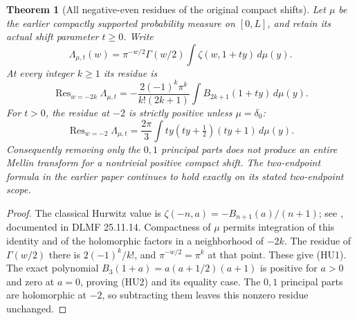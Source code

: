 \documentclass[11pt]{article}
\newtheorem{theorem}{Theorem}[section]
\begin{document}
\begin{theorem}[All negative-even residues of the original compact shifts]
Let $\mu$ be the earlier compactly supported probability measure
on $[0,L]$, and retain its actual shift parameter $t\ge0$. Write
\[
 \Lambda_{\mu,t}(w)=\pi^{-w/2}\Gamma(w/2)
             \int\zeta(w,1+ty)\,d\mu(y).
\]
At every integer $k\ge1$ its residue is
\[
 \operatorname{Res}_{w=-2k}\Lambda_{\mu,t}
 =-\frac{2(-1)^k\pi^k}{k!(2k+1)}
            \int B_{2k+1}(1+ty)\,d\mu(y).
 \tag{HU1}
\]
For $t>0$, the residue at $-2$ is strictly positive unless
$\mu=\delta_0$:
\[
 \operatorname{Res}_{w=-2}\Lambda_{\mu,t}
   =\frac{2\pi}{3}\int ty(ty+\tfrac12)(ty+1)\,d\mu(y).
 \tag{HU2}
\]
Consequently removing only the $0,1$ principal parts does not
produce an entire Mellin transform for a nontrivial positive
compact shift. The two-endpoint formula in the earlier paper
continues to hold exactly on its stated two-endpoint scope.
\end{theorem}
\begin{proof}
The classical Hurwitz value is
$\zeta(-n,a)=-B_{n+1}(a)/(n+1)$; see
\cite[Chapter 12]{ApostolHurwitz}, documented in DLMF 25.11.14.
Compactness of $\mu$ permits integration of this identity and of
the holomorphic factors in a neighborhood of $-2k$.
The residue of $\Gamma(w/2)$ there is $2(-1)^k/k!$,
and $\pi^{-w/2}=\pi^k$ at that point. These give (HU1).
The exact polynomial
$B_3(1+a)=a(a+1/2)(a+1)$ is positive for $a>0$ and zero
at $a=0$, proving (HU2) and its equality case.
The $0,1$ principal parts are holomorphic at $-2$, so subtracting
them leaves this nonzero residue unchanged.
\end{proof}
\end{document}
